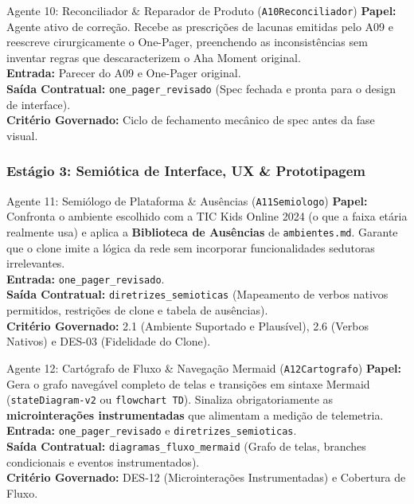 \documentclass[11pt,a4paper]{article}
\begin{document}
\begin{agentbox}{Agente 10: Reconciliador \& Reparador de Produto (\texttt{A10Reconciliador})}
\textbf{Papel:} Agente ativo de corre\c{c}\~ao. Recebe as prescri\c{c}\~oes de lacunas emitidas pelo A09 e reescreve cirurgicamente o One-Pager, preenchendo as inconsist\^encias sem inventar regras que descaracterizem o Aha Moment original.\\
\textbf{Entrada:} Parecer do A09 e One-Pager original.\\
\textbf{Sa\'ida Contratual:} \texttt{one\_pager\_revisado} (Spec fechada e pronta para o design de interface).\\
\textbf{Crit\'erio Governado:} Ciclo de fechamento mec\^anico de spec antes da fase visual.
\end{agentbox}

\subsubsection{Est\'agio 3: Semi\'otica de Interface, UX \& Prototipagem}

\begin{agentbox}{Agente 11: Semi\'ologo de Plataforma \& Aus\^encias (\texttt{A11Semiologo})}
\textbf{Papel:} Confronta o ambiente escolhido com a TIC Kids Online 2024 (o que a faixa et\'aria realmente usa) e aplica a \textbf{Biblioteca de Aus\^encias} de \texttt{ambientes.md}. Garante que o clone imite a l\'ogica da rede sem incorporar funcionalidades sedutoras irrelevantes.\\
\textbf{Entrada:} \texttt{one\_pager\_revisado}.\\
\textbf{Sa\'ida Contratual:} \texttt{diretrizes\_semioticas} (Mapeamento de verbos nativos permitidos, restri\c{c}\~oes de clone e tabela de aus\^encias).\\
\textbf{Crit\'erio Governado:} 2.1 (Ambiente Suportado e Plaus\'ivel), 2.6 (Verbos Nativos) e DES-03 (Fidelidade do Clone).
\end{agentbox}

\begin{agentbox}{Agente 12: Cart\'ografo de Fluxo \& Navega\c{c}\~ao Mermaid (\texttt{A12Cartografo})}
\textbf{Papel:} Gera o grafo naveg\'avel completo de telas e transi\c{c}\~oes em sintaxe Mermaid (\texttt{stateDiagram-v2} ou \texttt{flowchart TD}). Sinaliza obrigatoriamente as \textbf{microintera\c{c}\~oes instrumentadas} que alimentam a medi\c{c}\~ao de telemetria.\\
\textbf{Entrada:} \texttt{one\_pager\_revisado} e \texttt{diretrizes\_semioticas}.\\
\textbf{Sa\'ida Contratual:} \texttt{diagramas\_fluxo\_mermaid} (Grafo de telas, branches condicionais e eventos instrumentados).\\
\textbf{Crit\'erio Governado:} DES-12 (Microintera\c{c}\~oes Instrumentadas) e Cobertura de Fluxo.
\end{agentbox}
\end{document}
